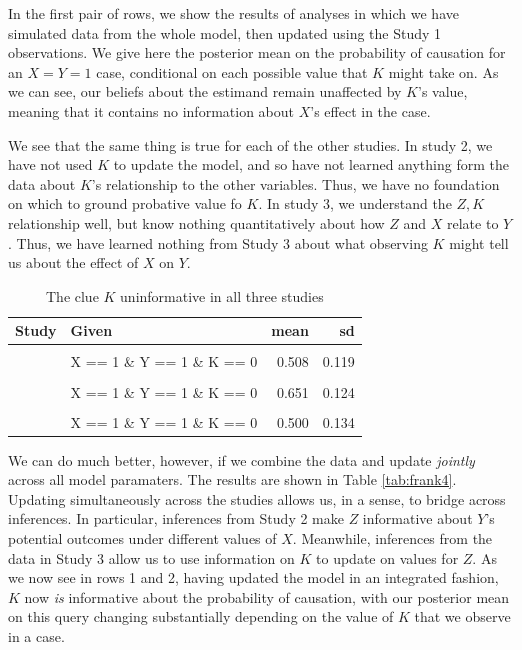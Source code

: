 \documentclass[
  12pt,
]{book}
\begin{document}
In the first pair of rows, we show the results of analyses in which we have simulated data from the whole model, then updated using the Study 1 observations. We give here the posterior mean on the probability of causation for an \(X=Y=1\) case, conditional on each possible value that \(K\) might take on. As we can see, our beliefs about the estimand remain unaffected by \(K\)'s value, meaning that it contains no information about \(X\)'s effect in the case.

We see that the same thing is true for each of the other studies. In study 2, we have not used \(K\) to update the model, and so have not learned anything form the data about \(K\)'s relationship to the other variables. Thus, we have no foundation on which to ground probative value fo \(K\). In study 3, we understand the \(Z,K\) relationship well, but know nothing quantitatively about how \(Z\) and \(X\) relate to \(Y\). Thus, we have learned nothing from Study 3 about what observing \(K\) might tell us about the effect of \(X\) on \(Y\).

\begin{table}

\caption{\label{tab:frank1}The clue $K$ uninformative in all three studies}
\centering
\begin{tabular}[t]{rlrr}
\toprule
Study & Given & mean & sd\\
\midrule
\cellcolor{gray!6}{1} & \cellcolor{gray!6}{X == 1 \& Y == 1 \& K == 1} & \cellcolor{gray!6}{0.592} & \cellcolor{gray!6}{0.126}\\
 & X == 1 \& Y == 1 \& K == 0 & 0.508 & 0.119\\
\cellcolor{gray!6}{2} & \cellcolor{gray!6}{X == 1 \& Y == 1 \& K == 1} & \cellcolor{gray!6}{0.650} & \cellcolor{gray!6}{0.122}\\
 & X == 1 \& Y == 1 \& K == 0 & 0.651 & 0.124\\
\cellcolor{gray!6}{3} & \cellcolor{gray!6}{X == 1 \& Y == 1 \& K == 1} & \cellcolor{gray!6}{0.500} & \cellcolor{gray!6}{0.158}\\
\addlinespace
 & X == 1 \& Y == 1 \& K == 0 & 0.500 & 0.134\\
\bottomrule
\end{tabular}
\end{table}

We can do much better, however, if we combine the data and update \emph{jointly} across all model paramaters. The results are shown in Table \ref{tab:frank4}. Updating simultaneously across the studies allows us, in a sense, to bridge across inferences. In particular, inferences from Study 2 make \(Z\) informative about \(Y\)'s potential outcomes under different values of \(X\). Meanwhile, inferences from the data in Study 3 allow us to use information on \(K\) to update on values for \(Z\). As we now see in rows 1 and 2, having updated the model in an integrated fashion, \(K\) now \emph{is} informative about the probability of causation, with our posterior mean on this query changing substantially depending on the value of \(K\) that we observe in a case.
\end{document}
